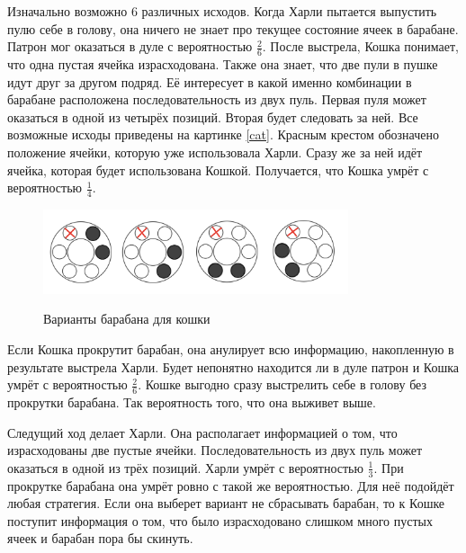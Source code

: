 \documentclass[12pt, a4paper, oneside]{extreport}
\theoremstyle{plain}              %
\theoremstyle{definition}         %
\begin{document}
\begin{sol}
Изначально возможно $6$ различных исходов. Когда Харли пытается выпустить пулю себе в голову, она ничего не знает про текущее состояние ячеек в барабане.  Патрон мог оказаться в дуле с вероятностью $\frac{2}{6}$. После выстрела, Кошка понимает, что одна пустая ячейка израсходована. Также она знает, что две пули в пушке идут друг за другом подряд. Её интересует в какой именно комбинации в барабане расположена последовательность из двух пуль. Первая пуля может оказаться в одной из четырёх позиций. Вторая будет следовать за ней. Все возможные исходы приведены на картинке \ref{cat}. Красным крестом обозначено положение ячейки, которую уже использовала Харли. Сразу же за ней идёт ячейка, которая будет использована Кошкой. Получается, что Кошка умрёт с вероятностью $\frac{1}{4}$.

\begin{figure}[H]
\begin{center}
	\includegraphics[width=0.8\textwidth]{gan_cat_1.png} \label{cat_1}
\end{center}
\caption{Варианты барабана для кошки} 
\end{figure}

Если Кошка прокрутит барабан, она анулирует всю информацию, накопленную в результате выстрела Харли. Будет непонятно находится ли в дуле патрон и Кошка умрёт с вероятностью $\frac{2}{6}$. Кошке выгодно сразу выстрелить себе в голову без прокрутки барабана. Так вероятность того, что она выживет выше.

Следущий ход делает Харли. Она располагает информацией о том, что израсходованы две пустые ячейки. Последовательность из двух пуль может оказаться в одной из трёх позиций. Харли умрёт с вероятностью $\frac{1}{3}$. При прокрутке барабана она умрёт ровно с такой же вероятностью. Для неё подойдёт любая стратегия. Если она выберет вариант не сбрасывать барабан, то к Кошке поступит информация о том, что было израсходовано слишком много пустых ячеек и барабан пора бы скинуть.
\end{sol} 
\end{document}
